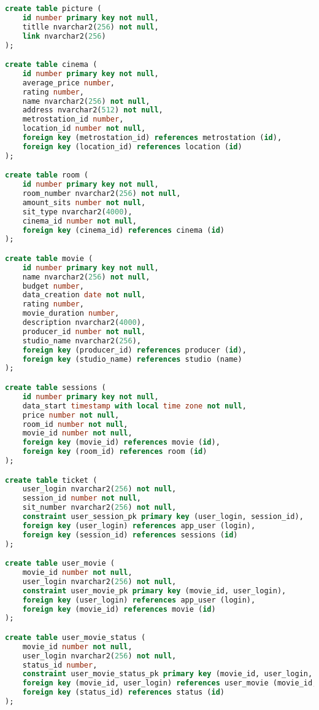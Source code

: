 \documentclass[a4paper,16pt]{article}
\begin{document}
\begin{lstlisting}[language=SQL]
create table picture (
    id number primary key not null,
    titlle nvarchar2(256) not null,
    link nvarchar2(256)
);

create table cinema (
    id number primary key not null,
    average_price number,
    rating number,
    name nvarchar2(256) not null,
    address nvarchar2(512) not null,
    metrostation_id number,
    location_id number not null, 
    foreign key (metrostation_id) references metrostation (id),
    foreign key (location_id) references location (id)
);

create table room (
    id number primary key not null,
    room_number nvarchar2(256) not null,
    amount_sits number not null,
    sit_type nvarchar2(4000),
    cinema_id number not null,
    foreign key (cinema_id) references cinema (id)
);

create table movie (
    id number primary key not null,
    name nvarchar2(256) not null,
    budget number,
    data_creation date not null,
    rating number,
    movie_duration number,
    description nvarchar2(4000),
    producer_id number not null,
    studio_name nvarchar2(256),
    foreign key (producer_id) references producer (id),
    foreign key (studio_name) references studio (name)
);

create table sessions (
    id number primary key not null,
    data_start timestamp with local time zone not null,
    price number not null,
    room_id number not null,
    movie_id number not null,
    foreign key (movie_id) references movie (id),
    foreign key (room_id) references room (id)
);

create table ticket (
    user_login nvarchar2(256) not null,
    session_id number not null,
    sit_number nvarchar2(256) not null,
    constraint user_session_pk primary key (user_login, session_id),
    foreign key (user_login) references app_user (login),
    foreign key (session_id) references sessions (id)
);

create table user_movie (
    movie_id number not null,
    user_login nvarchar2(256) not null,
    constraint user_movie_pk primary key (movie_id, user_login),
    foreign key (user_login) references app_user (login),
    foreign key (movie_id) references movie (id)
);

create table user_movie_status (
    movie_id number not null,
    user_login nvarchar2(256) not null,
    status_id number,
    constraint user_movie_status_pk primary key (movie_id, user_login, status_id),
    foreign key (movie_id, user_login) references user_movie (movie_id, user_login),
    foreign key (status_id) references status (id)
);


\end{lstlisting}
\end{document}
